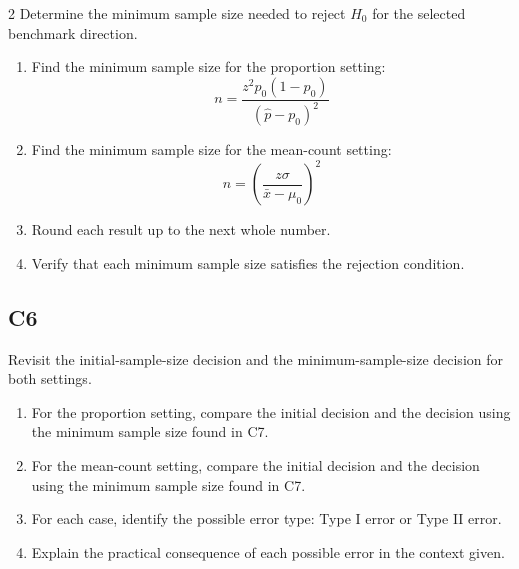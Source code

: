 \documentclass[12pt]{article}
\begin{document}
\begin{multicols}{2}
		Determine the minimum sample size needed to reject \(H_0\) for the selected benchmark direction.
		
		\begin{enumerate}
			\item Find the minimum sample size for the proportion setting:
			\[
			n=\frac{z^2p_0(1-p_0)}{(\hat p-p_0)^2}
			\]
			\item Find the minimum sample size for the mean-count setting:
			\[
			n=\left(\frac{z\sigma}{\bar x-\mu_0}\right)^2
			\]
			\item Round each result up to the next whole number.
			\item Verify that each minimum sample size satisfies the rejection condition.
		\end{enumerate}
		
		\subsection*{C6}
		
		Revisit the initial-sample-size decision and the minimum-sample-size decision for both settings.
		
		\begin{enumerate}
			\item For the proportion setting, compare the initial decision and the decision using the minimum sample size found in C7.
			\item For the mean-count setting, compare the initial decision and the decision using the minimum sample size found in C7.
			\item For each case, identify the possible error type: Type I error or Type II error.
			\item Explain the practical consequence of each possible error in the context given.
		\end{enumerate}
		
	\end{multicols}
	
\end{document}
